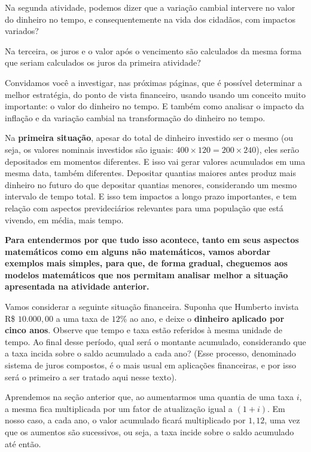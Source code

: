Na segunda atividade, podemos dizer que a variação cambial intervere no valor do dinheiro no tempo, e consequentemente na vida dos cidadãos, com impactos variados?

Na terceira, os juros e o valor após o vencimento são calculados da mesma forma que seriam calculados os juros da primeira atividade?

Convidamos você a investigar, nas próximas páginas, que é possível determinar a melhor estratégia, do ponto de vista financeiro, usando usando um conceito muito importante: o valor do dinheiro no tempo. E também como analisar o impacto da inflação e da variação cambial na transformação do dinheiro no tempo.

Na \textbf{primeira situação}, apesar do total de dinheiro investido ser o mesmo (ou seja, os valores nominais investidos são iguais: $400 \times 120 = 200 \times 240$), eles serão depositados em momentos diferentes. E isso vai gerar valores acumulados em uma mesma data, também diferentes. Depositar quantias maiores antes produz mais dinheiro no futuro do que depositar quantias menores, considerando um mesmo intervalo de tempo total. E isso tem impactos a longo prazo importantes, e tem relação com aspectos prevideciários relevantes para uma população que está vivendo, em média, mais tempo.

\textbf{Para entendermos por que tudo isso acontece, tanto em seus aspectos matemáticos como em alguns não matemáticos, vamos abordar exemplos mais simples, para que, de forma gradual, cheguemos aos modelos matemáticos que nos permitam analisar melhor a situação apresentada na atividade anterior.}

Vamos considerar a seguinte situação financeira. Suponha que Humberto invista R\$ $10.000{,}00$ a uma taxa de $12$\% ao ano, e deixe o \textbf{dinheiro aplicado por cinco anos}. Observe que tempo e taxa estão referidos à mesma unidade de tempo. Ao final desse período, qual será o montante acumulado, considerando que a taxa incida sobre o saldo acumulado a cada ano? (Esse processo, denominado sistema de juros compostos, é o mais usual em aplicações financeiras, e por isso será o primeiro a ser tratado aqui nesse texto).

Aprendemos na seção anterior que, ao aumentarmos uma quantia de uma taxa $i$, a mesma fica multiplicada por um fator de atualização igual a $(1+i)$. Em nosso caso, a cada ano, o valor acumulado ficará multiplicado por $1,12$, uma vez que os aumentos são sucessivos, ou seja, a taxa incide sobre o saldo acumulado até então.

